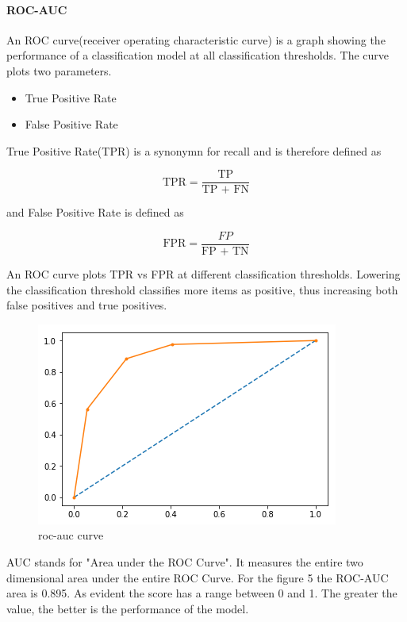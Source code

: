 \documentclass{book}
\begin{document}
\paragraph{ROC-AUC}%
An ROC curve(receiver operating characteristic curve) is a graph showing the performance of a classification model at all classification thresholds\cite{WEBSITE:17}. The curve plots two parameters.

\begin{itemize}
	\item True Positive Rate
	\item False Positive Rate
\end{itemize}

True Positive Rate(TPR) is a synonymn for recall and is therefore defined as

\begin{equation}
	\text{TPR} = \frac{\text{TP}}{\text{TP + FN}} 
\end{equation}

and False Positive Rate is defined as

\begin{equation}
	\text{FPR} = \frac{FP}{\text{FP + TN}}
\end{equation}

An ROC curve  plots TPR vs FPR at different classification thresholds. Lowering the classification threshold classifies more items as positive, thus increasing both false positives and true positives.

\begin{figure}[htpb]
	\centering
	\includegraphics[width=0.8\linewidth]{rocauc.png}
	\caption{roc-auc curve} 
	\label{fig:rocauc}
\end{figure}

AUC stands for "Area under the ROC Curve". It measures the entire two dimensional area under the entire ROC Curve. For the figure 5 the ROC-AUC area is 0.895. As evident the score has a range between 0 and 1. The greater the value, the better is the performance of the model.
\end{document}
